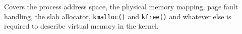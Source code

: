 Covers the process address space, the physical memory mapping, page fault
handling, the slab allocator, \texttt{kmalloc()} and
\texttt{kfree()} and whatever else is required to describe virtual memory
in the kernel.\\
